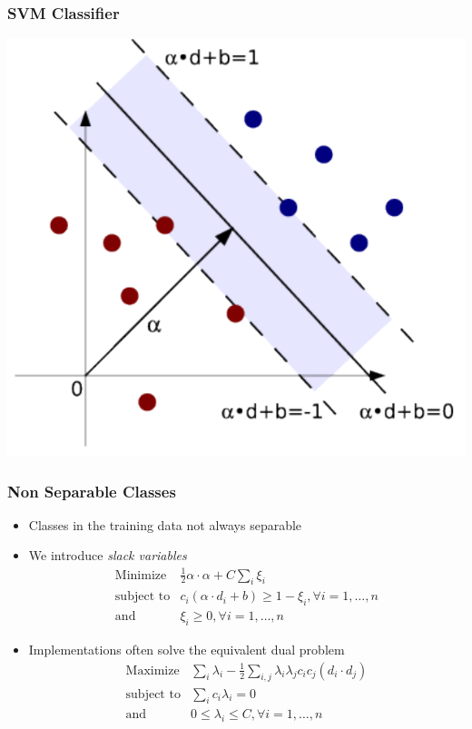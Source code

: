 \documentclass{beamer}
\begin{document}

\begin{frame} \frametitle{SVM Classifier}

  \centering
  \includegraphics[width=.7\linewidth]{svm}

\end{frame}


\begin{frame} \frametitle{Non Separable Classes}
  
  \begin{itemize}
  \item Classes in the training data not always separable
  \item We introduce \emph{slack variables}
    \begin{displaymath}
      \begin{array}{rl}
        \text{Minimize} & \frac{1}{2}\alpha\cdot\alpha + C\sum_i\xi_i \\
        \text{subject to} & c_i(\alpha\cdot d_i + b) \geq 1 - \xi_i,
        \forall i = 1, \dotsc, n \\
        \text{and} & \xi_i \geq 0, \forall i = 1, \dotsc, n 
      \end{array}
    \end{displaymath}
  \item Implementations often solve the equivalent dual problem
     \begin{displaymath}
      \begin{array}{rl}
         \text{Maximize} & \sum_i\lambda_i - \frac{1}{2}\sum_{i,j}\lambda_i\lambda_j c_i c_j (d_i \cdot d_j) \\
         \text{subject to} & \sum_i c_i\lambda_i = 0 \\
         \text{and} & 0 \leq \lambda_i \leq C, \forall i=1, \dotsc, n
      \end{array}
     \end{displaymath}
  \end{itemize}

\end{frame}
\end{document}
